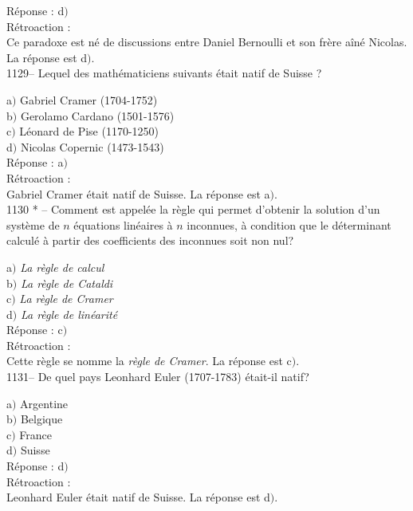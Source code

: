 ﻿\documentclass[letterpaper, 12pt]{article}
\begin{document}
R\'eponse : d$)$\\

R\'etroaction : \\
Ce paradoxe est n\'e de discussions entre Daniel Bernoulli et son
fr\`ere a\^in\'e Nicolas.
La r\'eponse est d$)$.\\

1129-- Lequel des math\'ematiciens suivants \'etait natif de Suisse
?

a$)$ Gabriel Cramer (1704-1752) \\
b$)$ Gerolamo Cardano (1501-1576) \\
c$)$ L\'eonard de Pise (1170-1250) \\
d$)$ Nicolas Copernic (1473-1543)\\

R\'eponse : a$)$\\

R\'etroaction : \\
Gabriel Cramer \'etait natif de Suisse.
La r\'eponse est a$)$.\\

1130 * -- Comment est appel\'ee la r\`egle qui permet d'obtenir la
solution d'un syst\`eme de $n$ \'equations lin\'eaires \`a $n$
inconnues, \`a condition que le d\'eterminant calcul\'e \`a partir
des coefficients des inconnues soit non nul?

a$)$ {\sl La r\`egle de calcul} \\
b$)$ {\sl La r\`egle de Cataldi} \\
c$)$ {\sl La r\`egle de Cramer} \\
d$)$ {\sl La r\`egle de lin\'earit\'e}   \\

R\'eponse : c$)$\\

R\'etroaction : \\
Cette r\`egle se nomme la {\sl r\`egle de Cramer}.
La r\'eponse est c$)$.\\

1131-- De quel pays Leonhard Euler (1707-1783) \'etait-il natif?

a$)$ Argentine\\
b$)$ Belgique \\
c$)$ France  \\
d$)$ Suisse  \\


R\'eponse : d$)$\\

R\'etroaction : \\
Leonhard Euler \'etait natif de Suisse. La r\'eponse est d$)$. \\
\end{document}
